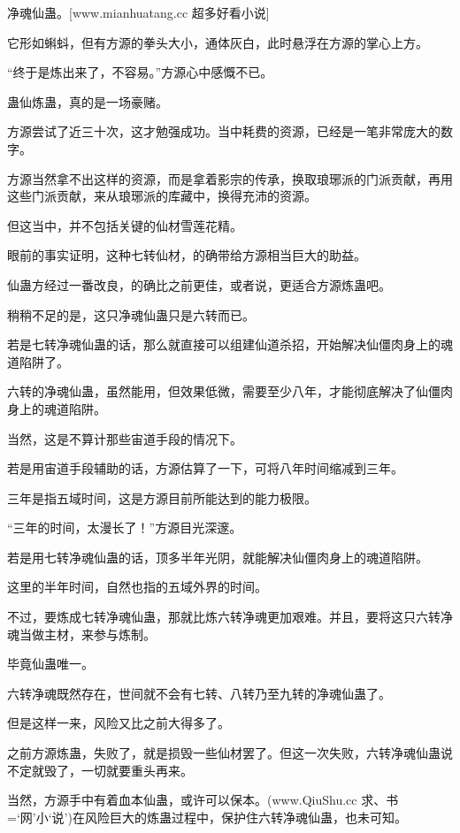 
\begin{this_body}

净魂仙蛊。[www.mianhuatang.cc 超多好看小说]

它形如蝌蚪，但有方源的拳头大小，通体灰白，此时悬浮在方源的掌心上方。

“终于是炼出来了，不容易。”方源心中感慨不已。

蛊仙炼蛊，真的是一场豪赌。

方源尝试了近三十次，这才勉强成功。当中耗费的资源，已经是一笔非常庞大的数字。

方源当然拿不出这样的资源，而是拿着影宗的传承，换取琅琊派的门派贡献，再用这些门派贡献，来从琅琊派的库藏中，换得充沛的资源。

但这当中，并不包括关键的仙材雪莲花精。

眼前的事实证明，这种七转仙材，的确带给方源相当巨大的助益。

仙蛊方经过一番改良，的确比之前更佳，或者说，更适合方源炼蛊吧。

稍稍不足的是，这只净魂仙蛊只是六转而已。

若是七转净魂仙蛊的话，那么就直接可以组建仙道杀招，开始解决仙僵肉身上的魂道陷阱了。

六转的净魂仙蛊，虽然能用，但效果低微，需要至少八年，才能彻底解决了仙僵肉身上的魂道陷阱。

当然，这是不算计那些宙道手段的情况下。

若是用宙道手段辅助的话，方源估算了一下，可将八年时间缩减到三年。

三年是指五域时间，这是方源目前所能达到的能力极限。

“三年的时间，太漫长了！”方源目光深邃。

若是用七转净魂仙蛊的话，顶多半年光阴，就能解决仙僵肉身上的魂道陷阱。

这里的半年时间，自然也指的五域外界的时间。

不过，要炼成七转净魂仙蛊，那就比炼六转净魂更加艰难。并且，要将这只六转净魂当做主材，来参与炼制。

毕竟仙蛊唯一。

六转净魂既然存在，世间就不会有七转、八转乃至九转的净魂仙蛊了。

但是这样一来，风险又比之前大得多了。

之前方源炼蛊，失败了，就是损毁一些仙材罢了。但这一次失败，六转净魂仙蛊说不定就毁了，一切就要重头再来。

当然，方源手中有着血本仙蛊，或许可以保本。(www.QiuShu.cc 求、书=‘网’小‘说’)在风险巨大的炼蛊过程中，保护住六转净魂仙蛊，也未可知。


\end{this_body}
